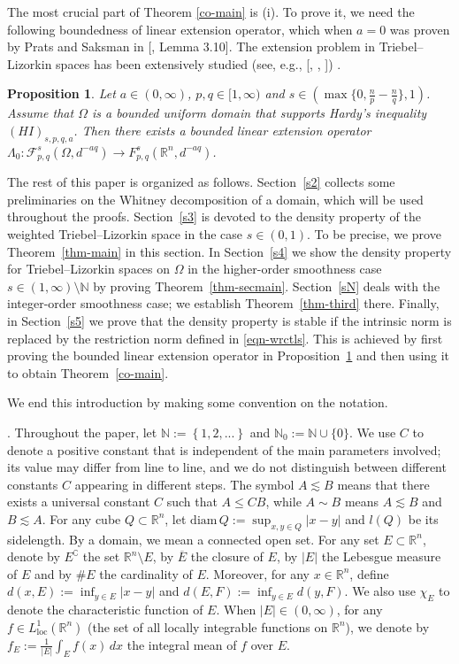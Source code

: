 \documentclass[11pt,twoside]{article}
\def\rn{{\mathbb{R}^n}}
\def\nn{{\mathbb N}}
\def\cf{{\mathcal F}}
\def\boz{{\Omega}}
\def\huafwe{{\cf}_{p,q}^s(\boz,d^{-aq})}
\theoremstyle{mylem}
\newtheorem{proposition}[theorem]{Proposition}
\theoremstyle{definition}
\numberwithin{equation}{section}
\begin{document}
The most crucial part of Theorem \ref{co-main} is (i). To prove it, we need the following boundedness of linear extension operator, which 
when $a=0$ was proven by Prats and Saksman in [\cite{ps2017}, Lemma 3.10]. The extension problem in Triebel--Lizorkin spaces has been extensively studied 
(see, e.g., [\cite{ayy2022}, \cite{hit2016}, \cite{zyy2024}]) .

\begin{proposition}\label{pro-main}
Let $a\in(0,\infty)$, $p,q \in [1, \infty)$ and $s\in(\max\{0,\frac{n}{p} - \frac{n}{q}\},1)$. Assume that $\boz$ is a bounded uniform domain
that  supports Hardy's inequality $(HI)_{s,p,q,a}$.
Then there exists a bounded linear extension operator $\Lambda_0\colon \huafwe \to F_{p,q}^{s}(\rn,d^{-aq})$.
\end{proposition}

The rest of this paper is organized as follows.
Section~\ref{s2} collects some preliminaries on the Whitney decomposition of a domain,
which will be used throughout the proofs.
Section~\ref{s3} is devoted to the density property of the weighted Triebel--Lizorkin space
in the case $s\in(0,1)$.
To be precise, we prove Theorem~\ref{thm-main} in this section.
In Section~\ref{s4} we show the density property for Triebel--Lizorkin spaces on $\Omega$
in the higher-order smoothness case $s\in(1,\infty)\setminus\mathbb{N}$
by proving Theorem~\ref{thm-secmain}.
Section~\ref{sN} deals with the integer-order smoothness case;
we establish Theorem~\ref{thm-third} there.
Finally, in Section~\ref{s5} we prove that the density property is stable
if the intrinsic norm is replaced by the restriction norm defined in \eqref{eqn-wrctls}.
This is achieved by first proving the bounded linear extension operator
in Proposition~\ref{pro-main} and then using it to obtain Theorem~\ref{co-main}.

We end this introduction by making some convention on the notation.

. Throughout the paper, let $\nn:=\left\{1,2,...\right\}$ and $\nn_0:=\nn\cup\{0\}$. 
We use $C$ to denote a positive constant that is independent of the main parameters involved; its value may differ from 
line to line, and we do not distinguish between different constants $C$ appearing in different steps.
The symbol $A\lesssim B$ means that there exists a universal constant $C$ such that $A\leq CB$, while $A\sim B$ 
means $A\lesssim B$ and $B\lesssim A$. For any cube $Q\subset\mathbb{R}^n$, let $\mathrm{diam\,}Q:=
\sup_{x,y\in Q}|x-y|$ and $l(Q)$ be its sidelength. By a domain, we mean a connected open set. 
For any set $E\subset \rn$, denote by $E^\complement $ the set $\rn\setminus E$, by $\overline{E}$ the 
closure of $E$, by $|E|$ the Lebesgue measure of $E$ and by $\#E$ the cardinality of $E$. Moreover, for any 
$x\in\rn$, define $d(x,E):=\inf_{y\in E}|x-y|$ and $d(E,F):=\inf_{y\in E}d(y,F)$.
We also use $\chi_E$ to denote the characteristic function of $E$. When $|E|\in(0,\infty)$, for any 
$f\in L_{\mathrm{loc}}^1(\rn)$ (the set of all locally integrable functions on $\rn$), we denote by 
$f_E:=\frac{1}{|E|}\int_E f(x)\,dx$ the integral mean of $f$ over $E$.
\end{document}
